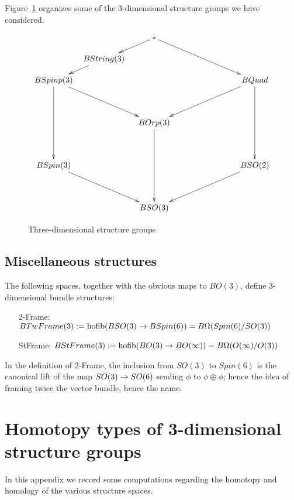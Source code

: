 \documentclass{amsart}
\begin{document}
Figure~\ref{fig-structuregroups} organizes some of the 3-dimensional structure groups we have considered.
\begin{figure}[!ht]
\[
\xymatrix@!R@!C@R=10pt@C=5pt{
&& \ast \ar[dl] \ar[ddrr] && \\
& BString(3) \ar[dl] &&& \\
BSpinp(3) \ar[ddrr] \ar[dddd] &&&& BQuad \ar[ddll] \ar[dddd] \\
&&&& \\
&& BOrp(3) \ar[dddd] && \\
&&&& \\
BSpin(3) \ar[ddrr] &&&& BSO(2) \ar[ddll] \\
&&&& \\
&& BSO(3) &&
}
\]
\caption{Three-dimensional structure groups} \label{fig-structuregroups}
\end{figure}

\subsection{Miscellaneous structures}

\begin{definition}
The following spaces, together with the obvious maps to $BO(3)$, define 3-dimensional bundle structures:
\begin{itemize}
\item[2-Frame:] $BTwFrame(3) := \operatorname{hofib}(BSO(3) \rightarrow BSpin(6)) = B\Omega(Spin(6)/SO(3))$
\item[StFrame:] $BStFrame(3) := \operatorname{hofib}(BO(3) \rightarrow BO(\infty)) = B\Omega(O(\infty)/O(3))$
\end{itemize}
\end{definition}

\nid In the definition of 2-Frame, the inclusion from $SO(3)$ to $Spin(6)$ is the canonical lift of the map $SO(3) \rightarrow SO(6)$ sending $\phi$ to $\phi \oplus \phi$; hence the idea of framing twice the vector bundle, hence the name.  


\section{Homotopy types of 3-dimensional structure groups}


In this appendix we record some computations regarding the homotopy and homology of the various structure spaces.
\end{document}
